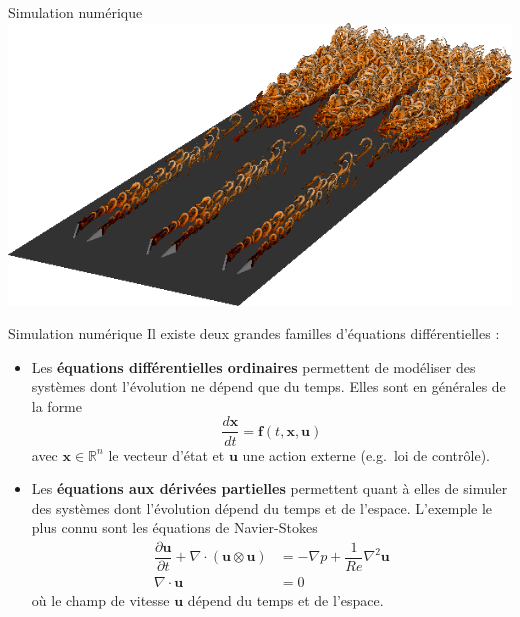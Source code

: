 \documentclass[usenames,dvipsnames,svgnames,10pt,aspectratio=169]{beamer}
\begin{document}
\begin{frame}[t, c]{Simulation numérique}{}
  \centering
  \includegraphics[width=.8\textwidth]{instability_and_transition}
\end{frame}

\begin{frame}[t, c]{Simulation numérique}{}
  Il existe deux grandes familles d'équations différentielles :
  \begin{itemize}
  \item Les \alert{\textbf{équations différentielles ordinaires}} permettent de modéliser des systèmes dont l'évolution ne dépend que du temps.
    Elles sont en générales de la forme
    \[
    \dfrac{d\bm{x}}{dt} = \bm{f}(t, \bm{x}, \bm{u})
    \]
    avec $\bm{x} \in \mathbb{R}^n$ le vecteur d'état et $\bm{u}$ une action externe (e.g.\ loi de contrôle).

    \medskip

  \item Les \alert{\textbf{équations aux dérivées partielles}} permettent quant à elles de simuler des systèmes dont l'évolution dépend du temps et de l'espace.
    L'exemple le plus connu sont les équations de Navier-Stokes
    \[
    \begin{aligned}
      \dfrac{\partial \bm{u}}{\partial t} + \nabla \cdot \left( \bm{u} \otimes \bm{u} \right) & = - \nabla p + \dfrac{1}{Re} \nabla^2 \bm{u} \\
      \nabla \cdot \bm{u} & = 0
    \end{aligned}
    \]
    où le champ de vitesse $\bm{u}$ dépend du temps et de l'espace.
  \end{itemize}

  \vspace{1cm}
\end{frame}
\end{document}
